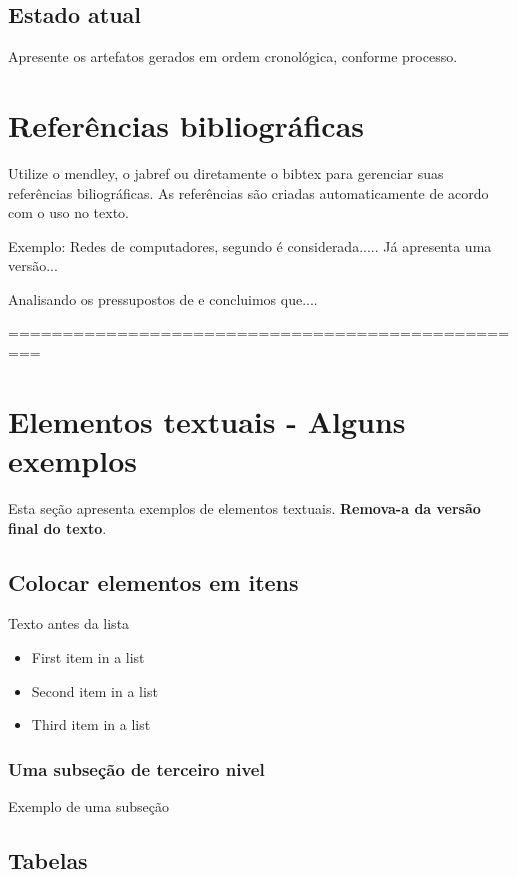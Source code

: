 \documentclass[	DIV=calc,%
							paper=a4,%
							fontsize=12pt,%
							onecolumn]{scrartcl}	 					%
\begin{document}
\subsection{Estado atual}
Apresente os artefatos gerados em ordem cronológica, conforme processo.


\section{Referências bibliográficas}
Utilize o mendley, o jabref ou diretamente o bibtex para gerenciar suas referências biliográficas. As referências são criadas automaticamente de acordo com o uso no texto.

Exemplo: Redes de computadores, segundo \cite{t2013} é considerada..... Já \cite{kurose2010} apresenta uma versão...

Analisando os pressupostos de \cite{ref3} e \cite{ref4} concluimos que....


\renewcommand\refname{} %

  


=================================================
\section{Elementos textuais - Alguns exemplos}

Esta seção apresenta exemplos de elementos textuais. \textbf{Remova-a da versão final do texto}.


\subsection{Colocar elementos em itens}

Texto antes da lista

\begin{itemize}
	\item First item in a list 
	\item Second item in a list 
\item Third item in a list
\end{itemize}
\subsubsection{Uma subseção de terceiro nivel}

Exemplo de uma subseção

\subsection{Tabelas}
\end{document}
